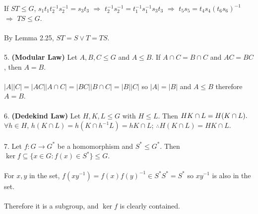 \documentclass{article}
\begin{document}
\begin{siderules}
If \(ST\le G\), \(s_{1}t_{1}t_{2}^{-1}s_{2}^{-1}=s_{3}t_{3}\) \(\Longrightarrow\) \(t_{2}^{-1}s_{2}^{-1}=t_{1}^{-1}s_{1}^{-1}s_{3}t_{3}\) \(\Longrightarrow\) \(t_{5}s_{5}=t_{4}s_{4}(t_{6}s_{6})^{-1}\) \(\Longrightarrow\) \(TS\le G\).\\\\
By \color{gray}Lemma 2.25\color{black}, \(ST=S\lor T=TS\).\\\\
\color{blue}5. \textbf{(Modular Law)} Let \(A,B,C\le G\) and \(A\le B\). If \(A\cap C=B\cap C\) and \(AC=BC\), then \(A=B\).\\\\\color{black}
\(|A||C|=|AC||A\cap C|=|BC||B\cap C|=|B||C|\) so \(|A|=|B|\) and \(A\le B\) therefore \(A=B\).\\\\
\color{blue}6. \textbf{(Dedekind Law)} Let \(H,K,L\le G\) with \(H\le L\). Then \(HK\cap L=H(K\cap L).\\\\\)\color{black}
\(\forall h\in H\), \(h(K\cap L)=h(K\cap h^{-1}L)=hK\cap L\); \(\therefore H(K\cap L)=HK\cap L\).\\\\
\color{blue}7. Let \(f:G\to G^{*}\) be a homomorphism and \(S^{*}\le G^{*}\). Then \(\ker f\subseteq \{x\in G:f(x)\in S^{*}\}\le G\).\\\\\color{black}
For \(x,y\) in the set, \(f(xy^{-1})=f(x)f(y)^{-1}\in S^{*}S^{*}=S^{*}\) so \(xy^{-1}\) is also in the set.\\\\
Therefore it is a subgroup, and \(\ker f\) is clearly contained.
\end{siderules}
\end{document}
